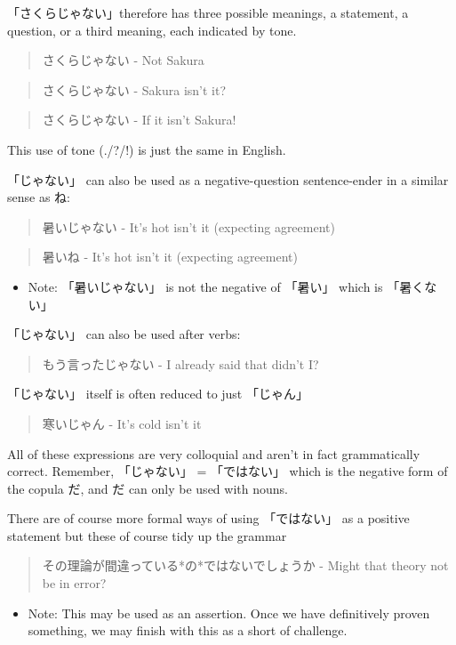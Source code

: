 \documentclass[11pt]{article}
\begin{document}
「さくらじゃない」therefore has three possible meanings, a statement, a question, or a third meaning, each indicated by tone.
\begin{quote}
さくらじゃない - Not Sakura
\end{quote}
\begin{quote}
さくらじゃない - Sakura isn't it?
\end{quote}
\begin{quote}
さくらじゃない - If it isn't Sakura!
\end{quote}
This use of tone (./?/!) is just the same in English.

「じゃない」 can also be used as a negative-question sentence-ender in a similar sense as ね:
\begin{quote}
暑いじゃない - It's hot isn't it (expecting agreement)
\end{quote}
\begin{quote}
暑いね - It's hot isn't it (expecting agreement)
\end{quote}
\begin{itemize}
\item Note: 「暑いじゃない」 is not the negative of 「暑い」 which is 「暑くない」
\end{itemize}

「じゃない」 can also be used after verbs:
\begin{quote}
もう言ったじゃない - I already said that didn't I?
\end{quote}

「じゃない」 itself is often reduced to just 「じゃん」
\begin{quote}
寒いじゃん - It's cold isn't it
\end{quote}

All of these expressions are very colloquial and aren't in fact grammatically correct. Remember, 「じゃない」 = 「ではない」 which is the negative form of the copula だ, and だ can only be used with nouns.

There are of course more formal ways of using 「ではない」 as a positive statement but these of course tidy up the grammar
\begin{quote}
その理論が間違っている*の*ではないでしょうか - Might that theory not be in error?
\end{quote}
\begin{itemize}
\item Note: This may be used as an assertion. Once we have definitively proven something, we may finish with this as a short of challenge.
\end{itemize}
\end{document}
